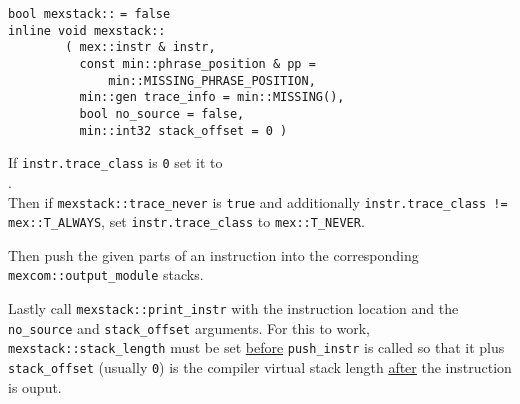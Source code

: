 \documentclass[12pt]{article}
\begin{document}
\verb|bool mexstack::|  \verb|= false| \\
\verb|inline void mexstack::| \label{PUSH-INSTR} \\
\verb|        ( mex::instr & instr,| \\
\verb|          const min::phrase_position & pp =| \\
\verb|              min::MISSING_PHRASE_POSITION,| \\
\verb|          min::gen trace_info = min::MISSING(),| \\
\verb|          bool no_source = false,| \\
\verb|          min::int32 stack_offset = 0 )|
\begin{indpar}
If {\tt instr.trace\_class} is {\tt 0} set it to \\
\hspace*{3em}{\tt mex::op\_\EOL infos[instr.op\_\EOL code].trace\_\EOL class}.
\\
Then if {\tt mexstack::\EOL trace\_\EOL never} is {\tt true} and
additionally {\tt instr.trace\_class != mex::\EOL T\_ALWAYS}, set
{\tt instr.trace\_class} to {\tt mex::T\_NEVER}.

Then push the given parts of an instruction into the corresponding
{\tt mexcom::\EOL output\_\EOL module} stacks.

Lastly call {\tt mexstack::print\_instr} with the instruction
location and the {\tt no\_source} and {\tt stack\_offset}
arguments.  For this to work, {\tt mexstack::stack\_length}
must be set \underline{before} {\tt push\_instr} is called
so that it plus {\tt stack\_offset} (usually {\tt 0})
is the compiler virtual stack length
\underline{after} the instruction is ouput.
\end{indpar}
\end{document}
